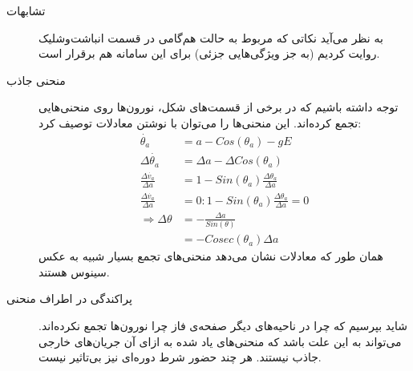 \begin{description}
	\item[تشابهات]
	به نظر می‌آید نکاتی که مربوط به حالت هم‌گامی در قسمت انباشت‌وشلیک روایت کردیم (به جز ویژگی‌هایی جزئی) برای این سامانه هم برقرار است. 
	\item[منحنی جاذب] 
	توجه داشته باشیم که در برخی از قسمت‌های شکل، نورون‌ها روی منحنی‌هایی تجمع کرده‌اند. این منحنی‌ها را می‌توان با نوشتن معادلات توصیف کرد:
	 \begin{align}
		\dot{\theta_a} &= a - Cos(\theta_a) - g E\\
		\Delta\dot{\theta_a} &= \Delta a - \Delta Cos(\theta_a)\\
		\frac{\Delta\dot{v_a}}{\Delta a} &= 1 - Sin(\theta_a)\frac{\Delta \theta_a}{\Delta a}\\
		\frac{\Delta\dot{v_a}}{\Delta a} &= 0 : 1 - Sin(\theta_a)\frac{\Delta \theta_a}{\Delta a} = 0\\
		\Rightarrow \Delta \theta &= - \frac{\Delta a}{Sin(\theta)}\\
		&= - Cosec(\theta_a) \Delta a
	\end{align}
همان طور که معادلات نشان می‌دهد منحنی‌های تجمع بسیار شبیه به عکس سینوس هستند. 
	\item[پراکندگی در اطراف منحنی]
	شاید بپرسیم که چرا در ناحیه‌های دیگر صفحه‌ی فاز چرا نورون‌ها تجمع نکرده‌اند. می‌تواند به این علت باشد که منحنی‌های یاد شده به ازای آن جریان‌های خارجی جاذب نیستند. هر چند حضور شرط دوره‌ای نیز بی‌تاثیر نیست.
\end{description}


